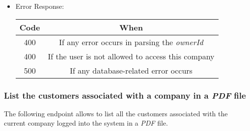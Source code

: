 \begin{itemize}
    \item Error Response:
    \begin{table}[!h]
    \centering 
    \begin{tabular}{|c|c|}
    \hline
    \multicolumn{1}{|c|}{\textbf{Code}} & \multicolumn{1}{c|}{\textbf{When}} \\ \hline
    400 & If any error occurs in parsing the \textit{ownerId}  \\\hline
    400 & If the user is not allowed to access this company \\\hline
    500 & If any database-related error occurs \\\hline
    \end{tabular} 
    \end{table} 
    
\end{itemize}


\newpage
\subsubsection*{List the customers associated with a company in a \textit{PDF} file}

The following endpoint allows to list all the customers associated with the current company logged into the system in a \textit{PDF} file.

